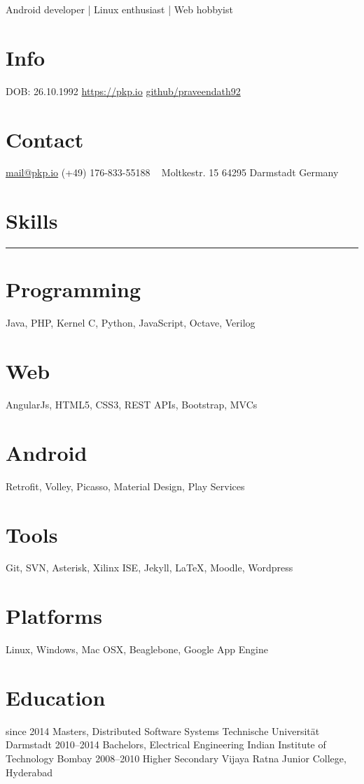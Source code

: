 \documentclass[]{friggeri-cv}
\begin{document}
       {Android developer | Linux enthusiast | Web hobbyist}

\begin{aside}
  \section{Info}
    DOB: 26.10.1992
    \href{https://pkp.io}{https://pkp.io}
    \href{http://github.com/praveendath92}{github/praveendath92}
  \section{Contact}
    \href{mailto:mail@pkp.io}{mail@pkp.io}
    (+49) 176-833-55188
    ~
    Moltkestr. 15
    64295 Darmstadt
    Germany
    ~
  \section{Skills}
    \noindent\rule{3cm}{0.5pt}
  \section{Programming}
    Java, PHP, Kernel C, Python, JavaScript, Octave, Verilog
  \section{Web}
    AngularJs, HTML5, CSS3, REST APIs, Bootstrap, MVCs
  \section{Android}
    Retrofit, Volley, Picasso, Material Design, Play Services
  \section{Tools}
    Git, SVN, Asterisk, Xilinx ISE, Jekyll, \LaTeX, Moodle, Wordpress
  \section{Platforms}
    Linux, Windows, Mac OSX, Beaglebone, Google App Engine
\end{aside}


\section{Education}

\begin{entrylist}
  \entry
    {since 2014}
    {Masters, {\normalfont Distributed Software Systems}}
    {Technische Universität Darmstadt}
    {}%
  \entry
    {2010–2014}
    {Bachelors, {\normalfont Electrical Engineering}}
    {Indian Institute of Technology Bombay}
    {}%
  \entry
    {2008–2010}
    {Higher Secondary}
    {Vijaya Ratna Junior College, Hyderabad}
    {}%
\end{entrylist}
\end{document}
